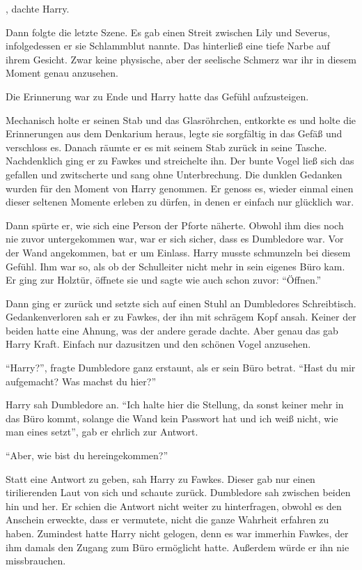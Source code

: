 , dachte Harry.

\begin{traum}
Dann folgte die letzte Szene. Es gab einen Streit zwischen Lily und Severus, infolgedessen er sie Schlammblut nannte. Das hinterließ eine tiefe Narbe auf ihrem Gesicht. Zwar keine physische, aber der seelische Schmerz war ihr in diesem Moment genau anzusehen.
\end{traum}

Die Erinnerung war zu Ende und Harry hatte das Gefühl aufzusteigen.

Mechanisch holte er seinen Stab und das Glasröhrchen, entkorkte es und holte die Erinnerungen aus dem Denkarium heraus, legte sie sorgfältig in das Gefäß und verschloss es. Danach räumte er es mit seinem Stab zurück in seine Tasche. Nachdenklich ging er zu Fawkes und streichelte ihn. Der bunte Vogel ließ sich das gefallen und zwitscherte und sang ohne Unterbrechung. Die dunklen Gedanken wurden für den Moment von Harry genommen. Er genoss es, wieder einmal einen dieser seltenen Momente erleben zu dürfen, in denen er einfach nur glücklich war.

Dann spürte er, wie sich eine Person der Pforte näherte. Obwohl ihm dies noch nie zuvor untergekommen war, war er sich sicher, dass es Dumbledore war. Vor der Wand angekommen, bat er um Einlass. Harry musste schmunzeln bei diesem Gefühl. Ihm war so, als ob der Schulleiter nicht mehr in sein eigenes Büro kam. Er ging zur Holztür, öffnete sie und sagte wie auch schon zuvor: \enquote{Öffnen.}

Dann ging er zurück und setzte sich auf einen Stuhl an Dumbledores Schreibtisch. Gedankenverloren sah er zu Fawkes, der ihn mit schrägem Kopf ansah. Keiner der beiden hatte eine Ahnung, was der andere gerade dachte. Aber genau das gab Harry Kraft. Einfach nur dazusitzen und den schönen Vogel anzusehen.

\enquote{Harry?}, fragte Dumbledore ganz erstaunt, als er sein Büro betrat. \enquote{Hast du mir aufgemacht? Was machst du hier?}

Harry sah Dumbledore an. \enquote{Ich halte hier die Stellung, da sonst keiner mehr in das Büro kommt, solange die Wand kein Passwort hat und ich weiß nicht, wie man eines setzt}, gab er ehrlich zur Antwort.

\enquote{Aber, wie bist du hereingekommen?}

Statt eine Antwort zu geben, sah Harry zu Fawkes. Dieser gab nur einen tirilierenden Laut von sich und schaute zurück. Dumbledore sah zwischen beiden hin und her. Er schien die Antwort nicht weiter zu hinterfragen, obwohl es den Anschein erweckte, dass er vermutete, nicht die ganze Wahrheit erfahren zu haben. Zumindest hatte Harry nicht gelogen, denn es war immerhin Fawkes, der ihm damals den Zugang zum Büro ermöglicht hatte. Außerdem würde er ihn nie missbrauchen.

